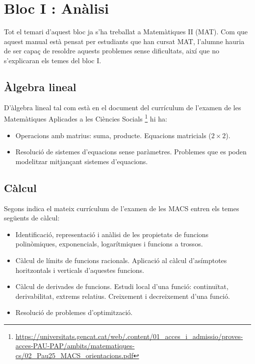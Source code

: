 \chapter{Bloc I : Anàlisi}
Tot el temari d'aquest bloc ja s'ha treballat a Matemàtiques II (MAT). Com que aquest manual està pensat per estudiants que han cursat MAT, l'alumne hauria de ser capaç de resoldre aquests problemes sense dificultats, així que no s'explicaran els temes del bloc I.
\section{Àlgebra lineal}
D'àlgebra lineal tal com està en el document del currículum de l'examen de les Matemàtiques Aplicades a les Ciències Socials \footnote{\url{https://universitats.gencat.cat/web/.content/01_acces_i_admissio/proves-acces-PAU-PAP/ambits/matematiques-cs/02_Pau25_MACS_orientacions.pdf}} hi ha:
\begin{itemize}
 \item Operacions amb matrius: suma, producte. Equacions matricials ($2 \times 2$).
 \item Resolució de sistemes d'equacions sense paràmetres. Problemes que es poden modelitzar mitjançant sistemes d'equacions.
\end{itemize}

\section{Càlcul}
Segons indica el mateix currículum de l'examen de les MACS entren els temes següents de càlcul:
\begin{itemize}
 \item Identificació, representació i anàlisi de les propietats de funcions polinòmiques, exponencials, logarítmiques i funcions a trossos.
 \item Càlcul de límits de funcions racionals. Aplicació al càlcul d'asímptotes horitzontals i verticals d'aquestes funcions.
 \item Càlcul de derivades de funcions. Estudi local d'una funció: continuïtat, derivabilitat, extrems relatius. Creixement i decreixement d'una funció.
 \item Resolució de problemes d'optimització.
\end{itemize}
